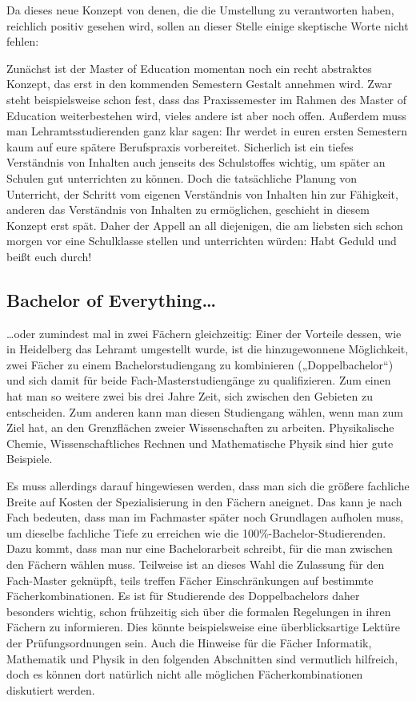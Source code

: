 Da dieses neue Konzept von denen, die die Umstellung zu verantworten haben,
reichlich positiv gesehen wird, sollen an dieser Stelle einige skeptische Worte
nicht fehlen:

Zunächst ist der Master of Education momentan noch ein recht abstraktes
Konzept, das erst in den kommenden Semestern Gestalt annehmen wird. Zwar steht
beispielsweise schon fest, dass das Praxissemester im Rahmen des Master of
Education weiterbestehen wird, vieles andere ist aber noch offen. Außerdem muss
man Lehramtsstudierenden ganz klar sagen: Ihr werdet in euren ersten Semestern
kaum auf eure spätere Berufspraxis vorbereitet. Sicherlich ist ein tiefes
Verständnis von Inhalten auch jenseits des Schulstoffes wichtig, um später an
Schulen gut unterrichten zu können. Doch die tatsächliche Planung von
Unterricht, der Schritt vom eigenen Verständnis von Inhalten hin zur Fähigkeit,
anderen das Verständnis von Inhalten zu ermöglichen, geschieht in diesem
Konzept erst spät. Daher der Appell an all diejenigen, die am liebsten sich
schon morgen vor eine Schulklasse stellen und unterrichten würden: Habt Geduld
und beißt euch durch!

\subsection{Bachelor of Everything\dots}

\dots oder zumindest mal in zwei Fächern gleichzeitig: Einer der Vorteile
dessen, wie in Heidelberg das Lehramt umgestellt wurde, ist die hinzugewonnene
Möglichkeit, zwei Fächer zu einem Bachelorstudiengang zu kombinieren
(„Doppelbachelor“) und sich damit für beide Fach-Masterstudiengänge zu
qualifizieren. Zum einen hat man so weitere zwei bis drei Jahre Zeit, sich
zwischen den Gebieten zu entscheiden. Zum anderen kann man diesen Studiengang
wählen, wenn man zum Ziel hat, an den Grenzflächen zweier Wissenschaften zu
arbeiten. Physikalische Chemie, Wissenschaftliches Rechnen und Mathematische
Physik sind hier gute Beispiele.

Es muss allerdings darauf hingewiesen werden, dass man sich die größere
fachliche Breite auf Kosten der Spezialisierung in den Fächern aneignet. Das
kann je nach Fach bedeuten, dass man im Fachmaster später noch Grundlagen
aufholen muss, um dieselbe fachliche Tiefe zu erreichen wie die
100\%-Bachelor-Studierenden. Dazu kommt, dass man nur eine Bachelorarbeit
schreibt, für die man zwischen den Fächern wählen muss. Teilweise ist an dieses
Wahl die Zulassung für den Fach-Master geknüpft, teils treffen Fächer
Einschränkungen auf bestimmte Fächerkombinationen. Es ist für Studierende des
Doppelbachelors daher besonders wichtig, schon frühzeitig sich über die
formalen Regelungen in ihren Fächern zu informieren. Dies könnte beispielsweise
eine überblicksartige Lektüre der Prüfungsordnungen sein. Auch die Hinweise für
die Fächer Informatik, Mathematik und Physik in den folgenden Abschnitten sind
vermutlich hilfreich, doch es können dort natürlich nicht alle möglichen
Fächerkombinationen diskutiert werden.


